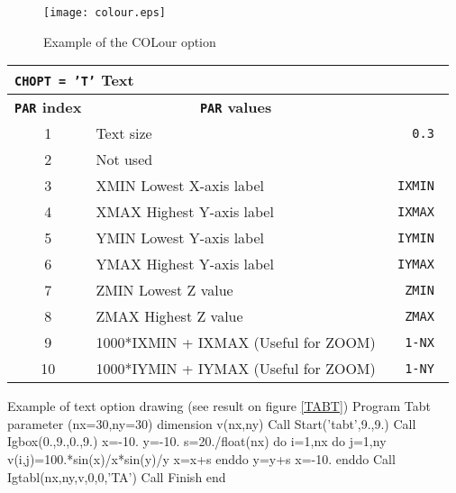 \begin{figure}[p]
\begin{center} \texttt{[image: colour.eps]} \end{center}
\caption{Example of the \protect{} COLour option}
\label{COLOUR}
\end{figure}

\vfill
\clearpage

\begin{center}
\begin{tabular}{||c|p{11cm}|>{\tt}r||}
\hline
\multicolumn{3}{||l||}{\bf {\tt CHOPT = 'T'} Text}             \\
\hline
\multicolumn{1}{||c|}{\bf {\tt PAR} index}           &
\multicolumn{1}{c|}{\bf {\tt PAR} values}            &
\multicolumn{1}{c||}{\bf default}                              \\
\hline
1  & Text size                                                      &   0.3   \\
2  & Not used                                                       &         \\
3  & XMIN Lowest X-axis label                                       &   IXMIN \\
4  & XMAX Highest Y-axis label                                      &   IXMAX \\
5  & YMIN Lowest Y-axis label                                       &   IYMIN \\
6  & YMAX Highest Y-axis label                                      &   IYMAX \\
7  & ZMIN Lowest Z value                                            &   ZMIN  \\
8  & ZMAX Highest Z value                                           &   ZMAX  \\
9  & 1000*IXMIN + IXMAX (Useful for ZOOM)                           &   1-NX  \\
10 & 1000*IYMIN + IYMAX (Useful for ZOOM)                           &   1-NY  \\
\hline
\end{tabular}
\end{center}

\bigskip

\begin{XMPt}{Example of text option drawing 
             (see result on figure \ref{TABT})}
      Program Tabt 
      parameter (nx=30,ny=30)
      dimension v(nx,ny)
      Call Start('tabt',9.,9.)
      Call Igbox(0.,9.,0.,9.)
      x=-10.
      y=-10.
      s=20./float(nx)
      do i=1,nx
         do j=1,ny
            v(i,j)=100.*sin(x)/x*sin(y)/y
            x=x+s
         enddo
         y=y+s
         x=-10.
      enddo
      Call Igtabl(nx,ny,v,0,0,'TA')
      Call Finish
      end
\end{XMPt}

